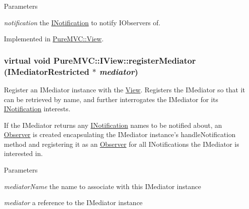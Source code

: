\begin{DoxyParams}{Parameters}
\item[{\em notification}]the {\ttfamily \hyperlink{class_pure_m_v_c_1_1_i_notification}{INotification}} to notify {\ttfamily IObservers} of. \end{DoxyParams}


Implemented in \hyperlink{class_pure_m_v_c_1_1_view_a515953a4f2e9c6b7a29ae0591657b9f3}{PureMVC::View}.\hypertarget{class_pure_m_v_c_1_1_i_view_a16db7b04ff8a9f03b65ae4c9beecb48d}{
\subsubsection[{registerMediator}]{\setlength{\rightskip}{0pt plus 5cm}virtual void PureMVC::IView::registerMediator ({\bf IMediatorRestricted} $\ast$ {\em mediator})}}
\label{class_pure_m_v_c_1_1_i_view_a16db7b04ff8a9f03b65ae4c9beecb48d}


Register an {\ttfamily IMediator} instance with the {\ttfamily \hyperlink{class_pure_m_v_c_1_1_view}{View}}. Registers the {\ttfamily IMediator} so that it can be retrieved by name, and further interrogates the {\ttfamily IMediator} for its {\ttfamily \hyperlink{class_pure_m_v_c_1_1_i_notification}{INotification}} interests. 

If the {\ttfamily IMediator} returns any {\ttfamily \hyperlink{class_pure_m_v_c_1_1_i_notification}{INotification}} names to be notified about, an {\ttfamily \hyperlink{class_pure_m_v_c_1_1_observer}{Observer}} is created encapsulating the {\ttfamily IMediator} instance's {\ttfamily handleNotification} method and registering it as an {\ttfamily \hyperlink{class_pure_m_v_c_1_1_observer}{Observer}} for all {\ttfamily INotifications} the {\ttfamily IMediator} is interested in.


\begin{DoxyParams}{Parameters}
\item[{\em mediatorName}]the name to associate with this {\ttfamily IMediator} instance \item[{\em mediator}]a reference to the {\ttfamily IMediator} instance \end{DoxyParams}


